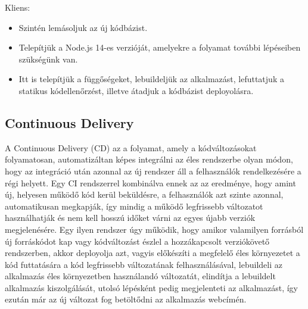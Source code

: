 \documentclass{elteikthesis}
\begin{document}
				Kliens:
				\begin{itemize}
					\setlength\itemsep{-0.5em}
					\item Szintén lemásoljuk az új kódbázist.
					\item Telepítjük a Node.js 14-es verzióját, amelyekre a folyamat további lépéseiben szükségünk van.
					\item Itt is telepítjük a függőségeket, lebuildeljük az alkalmazást, lefuttatjuk a statikus kódellenőrzést, illetve átadjuk a kódbázist deployolásra.
				\end{itemize}
			
			\subsection{Continuous Delivery}
        A Continuous Delivery (CD) \cite{cd} az a folyamat, amely a kódváltozásokat folyamatosan, automatizáltan képes integrálni az éles rendszerbe olyan módon, hogy az integráció után azonnal az új rendszer áll a felhasználók rendelkezésére a régi helyett. Egy CI rendszerrel kombinálva ennek az az eredménye, hogy amint új, helyesen működő kód kerül beküldésre, a felhasználók azt szinte azonnal, automatikusan megkapják, így mindig a működő legfrissebb változatot használhatják és nem kell hosszú időket várni az egyes újabb verziók megjelenésére. Egy ilyen rendszer úgy működik, hogy amikor valamilyen forrásból új forráskódot kap vagy kódváltozást észlel a hozzákapcsolt verziókövető rendszerben, akkor deployolja azt, vagyis előkészíti a megfelelő éles környezetet a kód futtatására a kód legfrissebb változatának felhasználásával, lebuildeli az alkalmazás éles környezetben használandó változatát, elindítja a lebuildelt alkalmazás kiszolgálását, utolsó lépésként pedig megjelenteti az alkalmazást, így ezután már az új változat fog betöltődni az alkalmazás webcímén.
\end{document}
